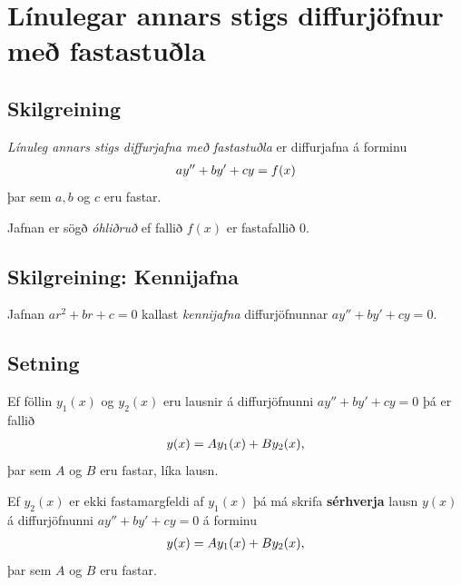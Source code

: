 \documentclass[a4paper,10pt,icelandic]{sphinxmanual}
\begin{document}
\section{Línulegar annars stigs diffurjöfnur með fastastuðla}
\label{kafli08:linulegar-annars-stigs-diffurjofnur-me-fastastula}

\subsection{Skilgreining}
\label{kafli08:skilgreining}
\emph{Línuleg annars stigs diffurjafna með fastastuðla} er diffurjafna á
forminu
\begin{gather}
\begin{split}ay''+by'+cy=f(x)\end{split}\notag
\end{gather}
þar sem \(a, b\) og \(c\) eru fastar.

Jafnan er sögð \emph{óhliðruð} ef fallið \(f(x)\) er
fastafallið 0.


\subsection{Skilgreining: Kennijafna}
\label{kafli08:skilgreining-kennijafna}\label{kafli08:index-6}
Jafnan \(ar^2+br+c=0\) kallast \textit{kennijafna}
diffurjöfnunnar \(ay''+by'+cy=0\).


\subsection{Setning}
\label{kafli08:setning}
Ef föllin \(y_1(x)\) og \(y_2(x)\) eru lausnir á diffurjöfnunni
\(ay''+by'+cy=0\) þá er fallið
\begin{gather}
\begin{split}y(x)=Ay_1(x)+By_2(x),\end{split}\notag
\end{gather}
þar sem \(A\) og \(B\) eru fastar, líka lausn.

Ef \(y_2(x)\) er ekki fastamargfeldi af \(y_1(x)\) þá má skrifa
\textbf{sérhverja} lausn \(y(x)\) á diffurjöfnunni \(ay''+by'+cy=0\)
á forminu
\begin{gather}
\begin{split}y(x)=Ay_1(x)+By_2(x),\end{split}\notag
\end{gather}
þar sem \(A\) og \(B\) eru fastar.
\end{document}
